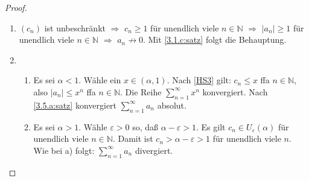 \documentclass[12pt]{extreport} %
\newcommand{\N}{\mathbb{N}}
\theoremstyle{named}
\theoremstyle{itshape}
\theoremstyle{normal}
\begin{document}
\begin{proof} ~\
	\begin{enumerate}
		\item $(c_{n})$ ist unbeschränkt $\Rightarrow$ $c_{n} \geq 1$ für unendlich viele $n\in \N$ $\Rightarrow$ $|a_{n}| \geq 1$ für unendlich viele 
		      $n\in \N$ $\Rightarrow$ $a_{n} \not\rightarrow 0$. Mit \ref{3.1.c:satz} folgt die Behauptung.
		\item  
			\begin{enumerate}
				\item Es sei $\alpha < 1$. Wähle ein $x \in (\alpha, 1)$. Nach \ref{HS3} gilt: $c_{n} \leq x$ ffa $n \in \N$, also 
				$|a_{n}| \leq x^{n}$ ffa $n \in \N$. Die Reihe $\sum_{n=1}^{\infty} x^{n}$ konvergiert. Nach \ref{3.5.a:satz} konvergiert
				$\sum_{n=1}^{\infty} a_{n}$ absolut. 
				\item Es sei $\alpha > 1$.  Wähle $\varepsilon > 0$ so, da{\ss} $\alpha - \varepsilon > 1$. Es gilt $c_{n} \in U_{\varepsilon}(\alpha)$ 
				für unendlich viele $n \in \N$. Damit ist $c_{n} > \alpha - \varepsilon > 1$ für unendlich viele $n$. Wie bei a) folgt:
				$\sum_{n=1}^{\infty} a_{n}$ divergiert. 
			\end{enumerate}
	\end{enumerate}
\end{proof}
\end{document}

